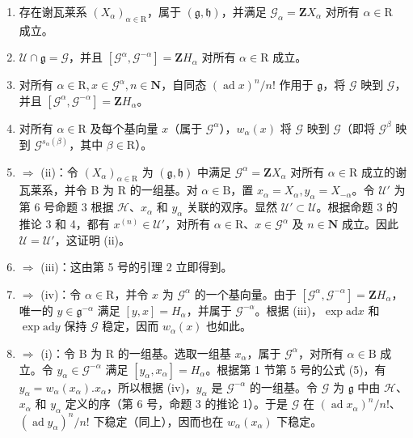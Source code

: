 \begin{enumerate}
\def\labelenumi{(\roman{enumi})}
\item
  存在谢瓦莱系 \((X_{\alpha})_{\alpha \in \mathrm{R}}\)，属于 \((\mathfrak{g},\mathfrak{h})\)，并满足 \(\mathcal{G}_{\alpha} = \mathbf{Z}X_{\alpha}\) 对所有 \(\alpha \in \mathrm{R}\) 成立。
\item
  \(\mathcal{U} \cap \mathfrak{g} = \mathcal{G}\)，并且 \([\mathcal{G}^{\alpha}, \mathcal{G}^{-\alpha}] = \mathbf{Z}H_{\alpha}\) 对所有 \(\alpha \in \mathrm{R}\) 成立。
\item
  对所有 \(\alpha \in \mathrm{R}, x \in \mathcal{G}^{\alpha}, n \in \mathbf{N}\)，自同态 \((\operatorname{ad} x)^n / n!\) 作用于 \(\mathfrak{g}\)，将 \(\mathcal{G}\) 映到 \(\mathcal{G}\)，并且 \([\mathcal{G}^{\alpha}, \mathcal{G}^{-\alpha}] = \mathbf{Z}H_{\alpha}\)。
\item
  对所有 \(\alpha \in \mathrm{R}\) 及每个基向量 \(x\)（属于 \(\mathcal{G}^{\alpha}\)），\(w_{\alpha}(x)\) 将 \(\mathcal{G}\) 映到 \(\mathcal{G}\)（即将 \(\mathcal{G}^{\beta}\) 映到 \(\mathcal{G}^{s_{\alpha}(\beta)}\)，其中 \(\beta \in \mathrm{R}\)）。
\item
  \(\Longrightarrow\) (ii)：令 \((X_{\alpha})_{\alpha \in \mathrm{R}}\) 为 \((\mathfrak{g},\mathfrak{h})\) 中满足 \(\mathcal{G}^{\alpha} = \mathbf{Z}X_{\alpha}\) 对所有 \(\alpha \in \mathrm{R}\) 成立的谢瓦莱系，并令 B 为 R 的一组基。对 \(\alpha \in \mathrm{B}\)，置 \(x_{\alpha} = X_{\alpha},y_{\alpha} = X_{-\alpha}\)。令 \(\mathcal{U}'\) 为第 6 号命题 3 根据 \(\mathcal{H}\)、\(x_{\alpha}\) 和 \(y_{\alpha}\) 关联的双序。显然 \(\mathcal{U}' \subset \mathcal{U}\)。根据命题 3 的推论 3 和 4，都有 \(x^{(n)} \in \mathcal{U}'\)，对所有 \(\alpha \in \mathrm{R}\)、\(x \in \mathcal{G}^{\alpha}\) 及 \(n \in \mathbf{N}\) 成立。因此 \(\mathcal{U} = \mathcal{U}'\)，这证明 (ii)。
\item
  \(\Longrightarrow\) (iii)：这由第 5 号的引理 2 立即得到。
\item
  \(\Longrightarrow\) (iv)：令 \(\alpha \in \mathrm{R}\)，并令 \(x\) 为 \(\mathcal{G}^{\alpha}\) 的一个基向量。由于 \([\mathcal{G}^{\alpha},\mathcal{G}^{-\alpha}] = \mathbf{Z}H_{\alpha}\)，唯一的 \(y \in \mathfrak{g}^{-\alpha}\) 满足 \([y,x] = H_{\alpha}\)，并属于 \(\mathcal{G}^{-\alpha}\)。根据 (iii)，\(\exp \mathrm{ad} x\) 和 \(\exp \mathrm{ad} y\) 保持 \(\mathcal{G}\) 稳定，因而 \(w_{\alpha}(x)\) 也如此。
\item
  \(\Longrightarrow\) (i)：令 B 为 R 的一组基。选取一组基 \(x_{\alpha}\)，属于 \(\mathcal{G}^{\alpha}\)，对所有 \(\alpha \in \mathrm{B}\) 成立。令 \(y_{\alpha} \in \mathcal{G}^{-\alpha}\) 满足 \([y_{\alpha}, x_{\alpha}] = H_{\alpha}\)。根据第 1 节第 5 号的公式 (5)，有 \(y_{\alpha} = w_{\alpha}(x_{\alpha}). x_{\alpha}\)，所以根据 (iv)，\(y_{\alpha}\) 是 \(\mathcal{G}^{-\alpha}\) 的一组基。令 \(\mathcal{G}\) 为 \(\mathfrak{g}\) 中由 \(\mathcal{H}\)、\(x_{\alpha}\) 和 \(y_{\alpha}\) 定义的序（第 6 号，命题 3 的推论 1）。于是 \(\mathcal{G}\) 在 \((\operatorname{ad} x_{\alpha})^{n} / n!\)、\((\operatorname{ad} y_{\alpha})^{n} / n!\) 下稳定（同上），因而也在 \(w_{\alpha}(x_{\alpha})\) 下稳定。
\end{enumerate}

